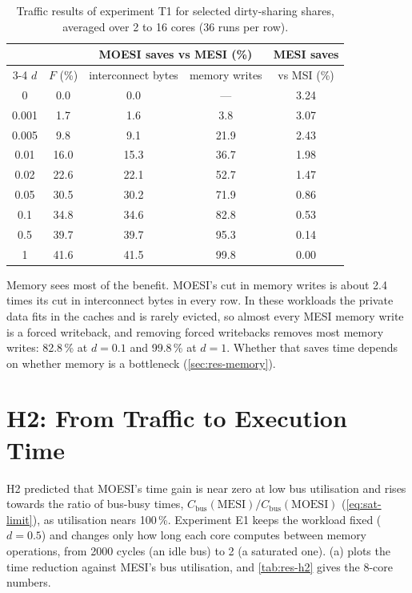 \begin{table}[htbp]
\centering
\caption{Traffic results of experiment T1 for selected dirty-sharing shares,
averaged over 2 to 16 cores (36 runs per row).}
\label{tab:res-traffic}
\small
\begin{tabular}{@{}c c c c c@{}}
\toprule
 & & \multicolumn{2}{c}{MOESI saves vs MESI (\%)} & MESI saves \\
\cmidrule(lr){3-4}
$d$ & $F$ (\%) & interconnect bytes & memory writes & vs MSI (\%) \\
\midrule
0 & 0.0 & 0.0 & --- & 3.24 \\
0.001 & 1.7 & 1.6 & 3.8 & 3.07 \\
0.005 & 9.8 & 9.1 & 21.9 & 2.43 \\
0.01 & 16.0 & 15.3 & 36.7 & 1.98 \\
0.02 & 22.6 & 22.1 & 52.7 & 1.47 \\
0.05 & 30.5 & 30.2 & 71.9 & 0.86 \\
0.1 & 34.8 & 34.6 & 82.8 & 0.53 \\
0.5 & 39.7 & 39.7 & 95.3 & 0.14 \\
1 & 41.6 & 41.5 & 99.8 & 0.00 \\
\bottomrule
\end{tabular}
\end{table}

Memory sees most of the benefit. MOESI's cut in memory writes is about 2.4 times
its cut in interconnect bytes in every row. In these workloads the private data
fits in the caches and is rarely evicted, so almost every MESI memory write is a
forced writeback, and removing forced writebacks removes most memory writes:
82.8\,\% at $d=0.1$ and 99.8\,\% at $d=1$. Whether that saves time depends on
whether memory is a bottleneck (\cref{sec:res-memory}).

\section{H2: From Traffic to Execution Time}
\label{sec:res-h2}
%

H2 predicted that MOESI's time gain is near zero at low bus utilisation and rises
towards the ratio of bus-busy times, $C_{\mathrm{bus}}(\mathrm{MESI}) /
C_{\mathrm{bus}}(\mathrm{MOESI})$ (\cref{eq:sat-limit}), as utilisation nears
100\,\%. Experiment E1 keeps the workload fixed ($d=0.5$) and changes only how long
each core computes between memory operations, from 2000 cycles (an idle bus) to 2
(a saturated one). (a) plots the time reduction against MESI's bus
utilisation, and \cref{tab:res-h2} gives the 8-core numbers.


